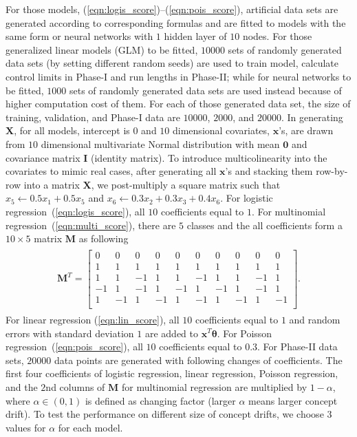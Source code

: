 \documentclass[twoside,11pt]{article}
\begin{document}
\begin{appendix}
For those models, (\ref{eqn:logis_score})--(\ref{eqn:pois_score}), artificial data sets are generated according to corresponding formulas and are fitted to models with the same form or neural networks with $1$ hidden layer of $10$ nodes. For those generalized linear models (GLM) to be fitted, $10000$ sets of randomly generated data sets (by setting different random seeds) are used to train model, calculate control limits in Phase-I and run lengths in Phase-II; while for neural networks to be fitted, $1000$ sets of randomly generated data sets are used instead because of higher computation cost of them. For each of those generated data set, the size of training, validation, and Phase-I data are $10000$, $2000$, and $20000$. In generating $\bm{X}$, for all models, intercept is $0$ and $10$ dimensional covariates, $\bm{x}$'s, are drawn from $10$ dimensional multivariate Normal distribution with mean $\bm{0}$ and covariance matrix $\mathbf {I}$ (identity matrix). To introduce multicolinearity into the covariates to mimic real cases, after generating all $\bm{x}$'s and stacking them row-by-row into a matrix $\mathbf{X}$, we post-multiply a square matrix such that $x_5 \leftarrow 0.5x_1+0.5x_5$ and $x_6 \leftarrow 0.3x_2+0.3x_3+0.4x_6$. For logistic regression~(\ref{eqn:logis_score}), all $10$ coefficients equal to $1$. For multinomial regression~(\ref{eqn:multi_score}), there are $5$ classes and the all coefficients form a $10\times 5$ matrix $\mathbf{M}$ as following
\begin{align}
\begin{aligned}
\mathbf{M}^T = 
\begin{bmatrix}
0 & 0 & 0 & 0 & 0 & 0 & 0 & 0 & 0 & 0\\
1 & 1 & 1 & 1 & 1 & 1 & 1 & 1 & 1 & 1\\
1 & 1 & -1 & 1 & 1 & -1 & 1 & 1 & -1 & 1\\
-1 & 1 & -1 & 1 & -1 & 1 & -1 & 1 & -1 & 1\\
1 & -1 & 1 & -1 & 1 & -1 & 1 & -1 & 1 & -1\\
\end{bmatrix}.
\end{aligned}
\end{align}
For linear regression (\ref{eqn:lin_score}), all $10$ coefficients equal to $1$ and random errors with standard deviation $1$ are added to $\bm{x}^T\bm{\theta}$. For Poisson regression~(\ref{eqn:pois_score}), all $10$ coefficients equal to $0.3$. For Phase-II data sets, $20000$ data points are generated with following changes of coefficients. The first four coefficients of logistic regression, linear regression, Poisson regression, and the $2$nd columns of $\mathbf{M}$ for multinomial regression are multiplied by $1-\alpha$, where $\alpha\in(0,1)$ is defined as changing factor (larger $\alpha$ means larger concept drift). To test the performance on different size of concept drifts, we choose $3$ values for $\alpha$ for each model.


\end{appendix}
\end{document}
